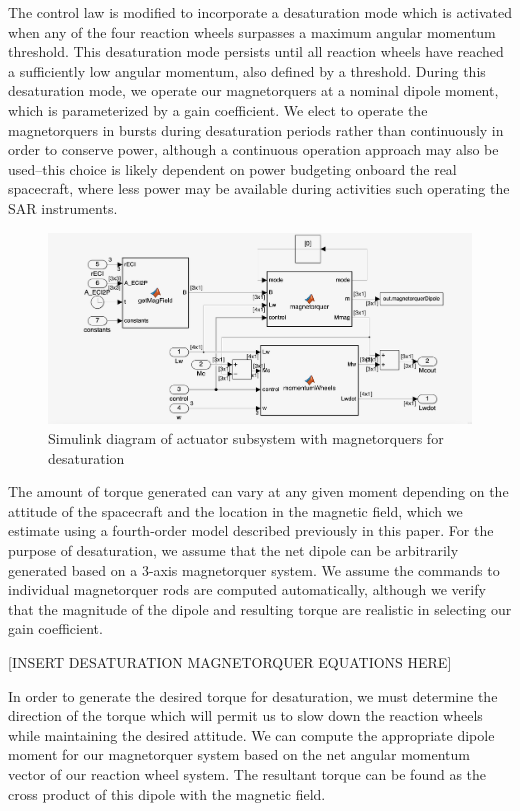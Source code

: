 The control law is modified to incorporate a desaturation mode which is activated when any of the four reaction wheels surpasses a maximum angular momentum threshold. This desaturation mode persists until all reaction wheels have reached a sufficiently low angular momentum, also defined by a threshold. During this desaturation mode, we operate our magnetorquers at a nominal dipole moment, which is parameterized by a gain coefficient. We elect to operate the magnetorquers in bursts during desaturation periods rather than continuously in order to conserve power, although a continuous operation approach may also be used–this choice is likely dependent on power budgeting onboard the real spacecraft, where less power may be available during activities such operating the SAR instruments.

\begin{figure}[H]
\centering
\includegraphics[scale=0.25]{Images/ps10_actuators.png}
\caption{Simulink diagram of actuator subsystem with magnetorquers for desaturation}
\label{fig:ps10_actuators}
\end{figure}

The amount of torque generated can vary at any given moment depending on the attitude of the spacecraft and the location in the magnetic field, which we estimate using a fourth-order model described previously in this paper. For the purpose of desaturation, we assume that the net dipole can be arbitrarily generated based on a 3-axis magnetorquer system.  We assume the commands to individual magnetorquer rods are computed automatically, although we verify that the magnitude of the dipole and resulting torque are realistic in selecting our gain coefficient.

[INSERT DESATURATION MAGNETORQUER EQUATIONS HERE]

In order to generate the desired torque for desaturation, we must determine the direction of the torque which will permit us to slow down the reaction wheels while maintaining the desired attitude. We can compute the appropriate dipole moment for our magnetorquer system based on the net angular momentum vector of our reaction wheel system. The resultant torque can be found as the cross product of this dipole with the magnetic field.

